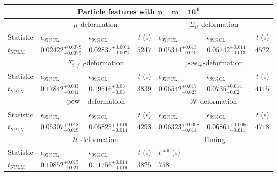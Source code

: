 \begin{tabular}{l|llr|llr}
	\toprule
	\multicolumn{7}{c}{{\bf Particle features with $\mathbf{n=m=10^{4}}$}} \\
	\toprule
	\multicolumn{1}{c}{} & \multicolumn{3}{c}{$\mu$-deformation} & \multicolumn{3}{c}{$\Sigma_{ii}$-deformation} \\
	Statistic & $\epsilon_{95\%\mathrm{CL}}$ & $\epsilon_{99\%\mathrm{CL}}$ & $t$ (s) & $\epsilon_{95\%\mathrm{CL}}$ & $\epsilon_{99\%\mathrm{CL}}$ & $t$ (s) \\
	\midrule
	$t_{\mathrm{NPLM}}$ & $0.02422_{-0.0075}^{+0.0079}$ & $0.02837_{-0.0074}^{+0.0072}$ & $5247$ & $0.05314_{-0.019}^{+0.013}$ & $0.05742_{-0.013}^{+0.014}$ & $4522$ \\
	\toprule
	\multicolumn{1}{c}{} & \multicolumn{3}{c}{$\Sigma_{i\neq j}$-deformation} & \multicolumn{3}{c}{$\rm{pow}_{+}$-deformation} \\
	Statistic & $\epsilon_{95\%\mathrm{CL}}$ & $\epsilon_{99\%\mathrm{CL}}$ & $t$ (s) & $\epsilon_{95\%\mathrm{CL}}$ & $\epsilon_{99\%\mathrm{CL}}$ & $t$ (s) \\
	\midrule
	$t_{\mathrm{NPLM}}$ & $0.17842_{-0.041}^{+0.033}$ & $0.19516_{-0.03}^{+0.03}$ & $3839$ & $0.06542_{-0.023}^{+0.017}$ & $0.0735_{-0.02}^{+0.014}$ & $4115$ \\
	\toprule
	\multicolumn{1}{c}{} & \multicolumn{3}{c}{$\rm{pow}_{-}$-deformation} & \multicolumn{3}{c}{$\mathcal{N}$-deformation} \\
	Statistic & $\epsilon_{95\%\mathrm{CL}}$ & $\epsilon_{99\%\mathrm{CL}}$ & $t$ (s) & $\epsilon_{95\%\mathrm{CL}}$ & $\epsilon_{99\%\mathrm{CL}}$ & $t$ (s) \\
	\midrule
	$t_{\mathrm{NPLM}}$ & $0.05307_{-0.019}^{+0.018}$ & $0.05825_{-0.014}^{+0.016}$ & $4293$ & $0.06323_{-0.014}^{+0.0098}$ & $0.06861_{-0.011}^{+0.0096}$ & $4718$ \\
	\toprule
	\multicolumn{1}{c}{} & \multicolumn{3}{c}{$\mathcal{U}$-deformation} & \multicolumn{3}{c}{Timing} \\
	Statistic & $\epsilon_{95\%\mathrm{CL}}$ & $\epsilon_{99\%\mathrm{CL}}$ & $t$ (s) & $t^{\mathrm{null}}$ (s) \\
	\midrule
	$t_{\mathrm{NPLM}}$ & $0.10852_{-0.021}^{+0.015}$ & $0.11756_{-0.019}^{+0.014}$ & $3825$ & $758$ \\
	\bottomrule
\end{tabular}
